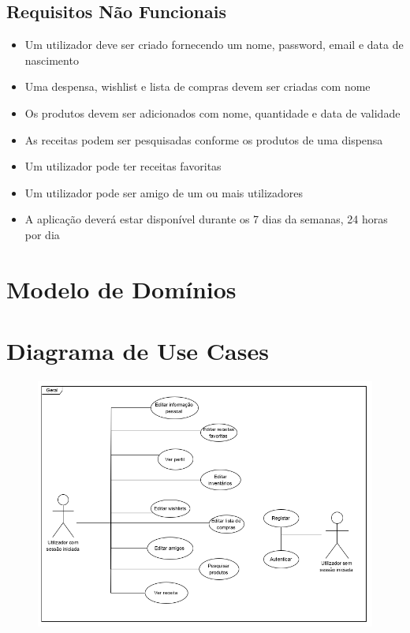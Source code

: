 \documentclass[a4paper]{report}
\begin{document}
    \section{Requisitos Não Funcionais}
    \begin{itemize}
        \item Um utilizador deve ser criado fornecendo um nome, password, email e data de nascimento
        \item Uma despensa, wishlist e lista de compras devem ser criadas com nome
        \item Os produtos devem ser adicionados com nome, quantidade e data de validade
        \item As receitas podem ser pesquisadas conforme os produtos de uma dispensa
        \item Um utilizador pode ter receitas favoritas
        \item Um utilizador pode ser amigo de um ou mais utilizadores
        \item A aplicação deverá estar disponível durante os 7 dias da semanas, 24 horas por dia
    \end{itemize}

\chapter{Modelo de Domínios}

\chapter{Diagrama de Use Cases}
    \begin{figure}[H]
    \centering
        \includegraphics[width=\textwidth]{images/diagrama_use_cases.png}
    \end{figure}
\end{document}
